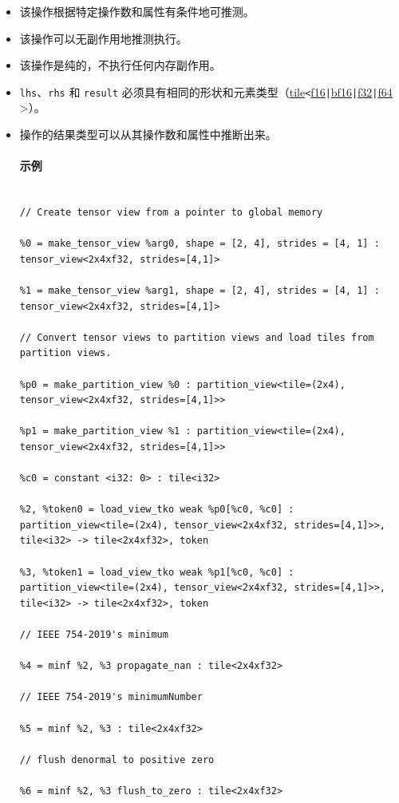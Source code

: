 \documentclass{article}
\begin{document}
\begin{itemize}
\item 该操作根据特定操作数和属性有条件地可推测。
\item 该操作可以无副作用地推测执行。
\item 该操作是纯的，不执行任何内存副作用。
\item \texttt{lhs}、\texttt{rhs} 和 \texttt{result} 必须具有相同的形状和元素类型（\href{https://docs.nvidia.com/cuda/tile-ir/latest/sections/types.html#type-tile}{tile}\texttt{<}\href{https://docs.nvidia.com/cuda/tile-ir/latest/sections/types.html#subsection-element-types}{f16}\texttt{|}\href{https://docs.nvidia.com/cuda/tile-ir/latest/sections/types.html#subsection-element-types}{bf16}\texttt{|}\href{https://docs.nvidia.com/cuda/tile-ir/latest/sections/types.html#subsection-element-types}{f32}\texttt{|}\href{https://docs.nvidia.com/cuda/tile-ir/latest/sections/types.html#subsection-element-types}{f64} >）。
\item 操作的结果类型可以从其操作数和属性中推断出来。




\paragraph{示例}


\begin{lstlisting}

// Create tensor view from a pointer to global memory

%0 = make_tensor_view %arg0, shape = [2, 4], strides = [4, 1] : tensor_view<2x4xf32, strides=[4,1]>

%1 = make_tensor_view %arg1, shape = [2, 4], strides = [4, 1] : tensor_view<2x4xf32, strides=[4,1]>

// Convert tensor views to partition views and load tiles from partition views.

%p0 = make_partition_view %0 : partition_view<tile=(2x4), tensor_view<2x4xf32, strides=[4,1]>>

%p1 = make_partition_view %1 : partition_view<tile=(2x4), tensor_view<2x4xf32, strides=[4,1]>>

%c0 = constant <i32: 0> : tile<i32>

%2, %token0 = load_view_tko weak %p0[%c0, %c0] : partition_view<tile=(2x4), tensor_view<2x4xf32, strides=[4,1]>>, tile<i32> -> tile<2x4xf32>, token

%3, %token1 = load_view_tko weak %p1[%c0, %c0] : partition_view<tile=(2x4), tensor_view<2x4xf32, strides=[4,1]>>, tile<i32> -> tile<2x4xf32>, token

// IEEE 754-2019's minimum

%4 = minf %2, %3 propagate_nan : tile<2x4xf32>

// IEEE 754-2019's minimumNumber

%5 = minf %2, %3 : tile<2x4xf32>

// flush denormal to positive zero

%6 = minf %2, %3 flush_to_zero : tile<2x4xf32>

\end{lstlisting}



\end{itemize}
\end{document}
